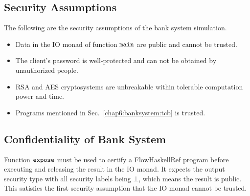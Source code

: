 \documentclass{report}
\newcommand{\co}[1]{$\cod{#1}$}
\begin{document}
\subsection{Security Assumptions}
The following are the security assumptions of the bank system simulation.
\begin{itemize}
\item Data in the IO monad of function \co{main} are public and cannot be trusted.
\item The client's password is well-protected and can not be obtained by unauthorized people.
\item RSA and AES cryptosystems are unbreakable within tolerable computation power and time.
\item Programs mentioned in Sec.~\ref{chap6:banksystem:tcb} is trusted.
\end{itemize}

\subsection{Confidentiality of Bank System}
Function \co{expose} must be used to certify a FlowHaskellRef program before executing and releasing the 
result in the IO monad. It expects the output security
type with all security labels being $\bot$, which means the result is public. This satisfies the first 
security assumption that the IO monad cannot be trusted.
\end{document}
